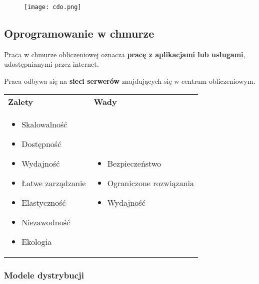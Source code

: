 \documentclass[../main.tex]{subfiles}
\begin{document}
    \begin{figure}[H]
        \texttt{[image: cdo.png]}
    \end{figure}


    \subsection{Oprogramowanie w chmurze}
    Praca w chmurze obliczeniowej oznacza \textbf{pracę z aplikacjami lub usługami}, udostępnianymi przez
    internet.

    Praca odbywa się na \textbf{sieci serwerów} znajdujących się w centrum obliczeniowym.

    \begin{table}[H]
        \begin{center}
            \begin{tabular}{ p{.5\linewidth} p{.5\linewidth}}
                \textbf{Zalety} & \textbf{Wady}\\

                \begin{itemize}
                    \item Skalowalność
                    \item Dostępność
                    \item Wydajność
                    \item Łatwe zarządzanie
                    \item Elastyczność
                    \item Niezawodność
                    \item Ekologia
                \end{itemize}
                &
                \begin{itemize}
                    \item Bezpieczeństwo
                    \item Ograniczone rozwiązania
                    \item Wydajność
                \end{itemize}
            \end{tabular}
        \end{center}
    \end{table}



    \subsubsection{Modele dystrybucji}
\end{document}
